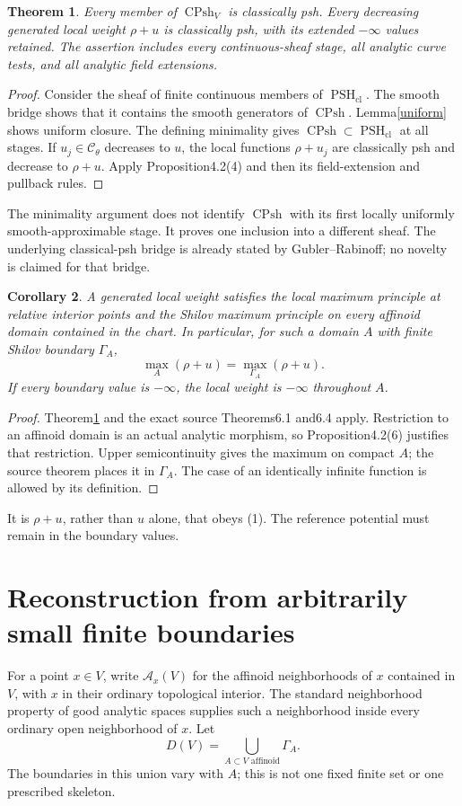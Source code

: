 \documentclass[11pt]{article}
\newtheorem{theorem}{Theorem}
\newtheorem{corollary}[theorem]{Corollary}
\newcommand{\CPsh}{\operatorname{CPsh}}
\newcommand{\PSH}{\operatorname{PSH}_{\mathrm{cl}}}
\begin{document}
\begin{theorem}\label{recognition}
Every member of $\CPsh_V$ is classically psh. Every decreasing generated
local weight $\rho+u$ is classically psh, with its extended $-\infty$
values retained. The assertion includes every continuous-sheaf stage,
all analytic curve tests, and all analytic field extensions.
\end{theorem}
\begin{proof}
Consider the sheaf of finite continuous members of $\PSH$.
The smooth bridge shows that it contains the smooth generators of
$\CPsh$. Lemma\ref{uniform} shows uniform closure.
The defining minimality gives $\CPsh\subset\PSH$ at all stages.
If $u_j\in\mathcal C_\theta$ decreases to $u$, the local functions
$\rho+u_j$ are classically psh and decrease to $\rho+u$.
Apply Proposition4.2(4) and then its field-extension and pullback rules.
\end{proof}
The minimality argument does not identify $\CPsh$ with its first
locally uniformly smooth-approximable stage. It proves one inclusion
into a different sheaf. The underlying classical-psh bridge is already
stated by Gubler--Rabinoff; no novelty is claimed for that bridge.

\begin{corollary}\label{maximum}
A generated local weight satisfies the local maximum principle at
relative interior points and the Shilov maximum principle on every
affinoid domain contained in the chart. In particular, for such a domain
$A$ with finite Shilov boundary $\Gamma_A$,
\[
 \max_{A}(\rho+u)=\max_{\Gamma_A}(\rho+u).
 \tag{1}
\]
If every boundary value is $-\infty$, the local weight is $-\infty$
throughout $A$.
\end{corollary}
\begin{proof}
Theorem\ref{recognition} and the exact source Theorems6.1 and6.4 apply.
Restriction to an affinoid domain is an actual analytic morphism, so
Proposition4.2(6) justifies that restriction. Upper semicontinuity gives
the maximum on compact $A$; the source theorem places it in $\Gamma_A$.
The case of an identically infinite function is allowed by its definition.
\end{proof}
It is $\rho+u$, rather than $u$ alone, that obeys (1). The reference
potential must remain in the boundary values.

\section{Reconstruction from arbitrarily small finite boundaries}
For a point $x\in V$, write $\mathcal A_x(V)$ for the affinoid
neighborhoods of $x$ contained in $V$, with $x$ in their ordinary
topological interior. The standard neighborhood property of good
analytic spaces supplies such a neighborhood inside every ordinary
open neighborhood of $x$. Let
\[
 D(V)=\bigcup_{A\subset V\text{ affinoid}}\Gamma_A.
\]
The boundaries in this union vary with $A$; this is not one fixed finite
set or one prescribed skeleton.
\end{document}
